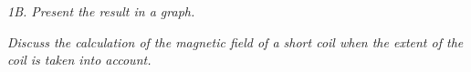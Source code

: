 \documentclass[../Elmag-labhefte-2020.tex]{subfiles}
\begin{document}

\emph{ 1B. Present the result in a graph.}

\emph{ Discuss the calculation of the magnetic field of a short coil when the extent of the coil is taken into account.}
\end{document}
